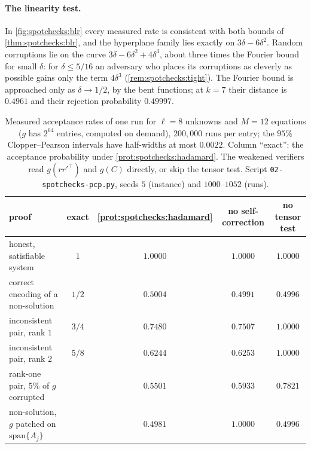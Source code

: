 \begin{refsection}
\paragraph{The linearity test.} In \cref{fig:spotchecks:blr} every measured rate is consistent with both bounds of \cref{thm:spotchecks:blr}, and the hyperplane family lies exactly on $3\delta-6\delta^2$. Random corruptions lie on the curve $3\delta-6\delta^2+4\delta^3$, about three times the Fourier bound for small $\delta$: for $\delta\le5/16$ an adversary who places its corruptions as cleverly as possible gains only the term $4\delta^3$ (\cref{rem:spotchecks:tight}). The Fourier bound is approached only as $\delta\to1/2$, by the bent functions; at $k=7$ their distance is $0.4961$ and their rejection probability $0.49997$.

\begin{table}[t]
\begin{fullwidth}
\centering\small
\begin{tabular}{@{}lcccc@{}}
\toprule
proof & exact & \cref{prot:spotchecks:hadamard} & no self-correction & no tensor test\\
\midrule
honest, satisfiable system & $1$ & $1.0000$ & $1.0000$ & $1.0000$\\
correct encoding of a non-solution & $1/2$ & $0.5004$ & $0.4991$ & $0.4996$\\
inconsistent pair, rank $1$ & $3/4$ & $0.7480$ & $0.7507$ & $1.0000$\\
inconsistent pair, rank $2$ & $5/8$ & $0.6244$ & $0.6253$ & $1.0000$\\
rank-one pair, $5\%$ of $g$ corrupted & & $0.5501$ & $0.5933$ & $0.7821$\\
non-solution, $g$ patched on $\mathrm{span}\{A_j\}$ & & $0.4981$ & $1.0000$ & $0.4996$\\
\bottomrule
\end{tabular}
\end{fullwidth}
\caption{Measured acceptance rates of one run for $\ell=8$ unknowns and $M=12$ equations ($g$ has $2^{64}$ entries, computed on demand), $200{,}000$ runs per entry; the $95\%$ Clopper--Pearson intervals have half-widths at most $0.0022$. Column ``exact'': the acceptance probability under \cref{prot:spotchecks:hadamard}. The weakened verifiers read $g(rr'^\top)$ and $g(C)$ directly, or skip the tensor test. Script \texttt{02-\allowbreak spotchecks-\allowbreak pcp.py}, seeds $5$ (instance) and $1000$--$1052$ (runs).}
\label{tab:spotchecks:runs}
\end{table}


\end{refsection}
